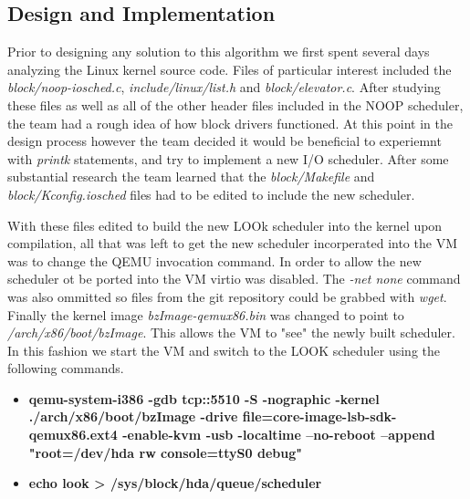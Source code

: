 \documentclass[10pt,onecolumn,draftclsnofoot]{IEEEtran} %
\begin{document}
\newpage
\begin{singlespace}
\section{\bf  Design and Implementation}

  \normalfont \indent Prior to designing any solution to this algorithm we first spent several days analyzing the Linux kernel source code. Files of particular interest included the \textit{block/noop-iosched.c}, \textit{include/linux/list.h} and \textit{block/elevator.c}. After studying these files as well as all of the other header files included in the NOOP scheduler, the team had a rough idea of how block drivers functioned. At this point in the design process however the team decided it would be beneficial to experiemnt with \textit{printk} statements, and try to implement a new I/O scheduler. After some substantial research the team learned that the \textit{block/Makefile} and \textit{block/Kconfig.iosched} files had to be edited to include the new scheduler. 

  \normalfont \indent With these files edited to build the new LOOk scheduler into the kernel upon compilation, all that was left to get the new scheduler incorperated into the VM was to change the QEMU invocation command. In order to allow the new scheduler ot be ported into the VM virtio was disabled. The \textit{-net none} command was also ommitted so files from the git repository could be grabbed with \textit{wget}. Finally the kernel image \textit{bzImage-qemux86.bin} was changed to point to \textit{/arch/x86/boot/bzImage}. This allows the VM to "see" the newly built scheduler. In this fashion we start the VM and switch to the LOOK scheduler using the following commands.

  \begin{itemize}
    	\item \textbf{qemu-system-i386 -gdb tcp::5510 -S -nographic -kernel ./arch/x86/boot/bzImage -drive file=core-image-lsb-sdk-qemux86.ext4 -enable-kvm -usb -localtime --no-reboot --append "root=/dev/hda rw console=ttyS0 debug"}
	\item \textbf{echo look > /sys/block/hda/queue/scheduler}
  \end{itemize}
  

\end{singlespace}
\end{document}
